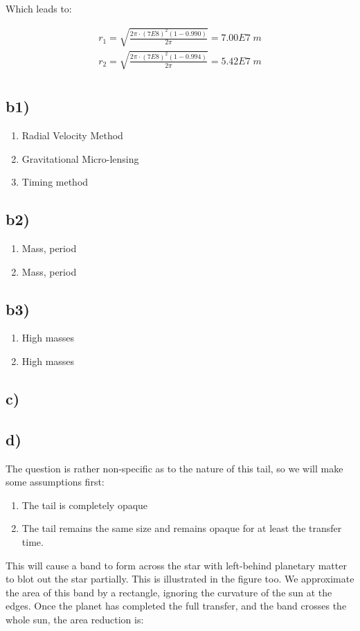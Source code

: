 Which leads to:

\begin{equation}
\begin{split}
    r_{1} = \sqrt{ \frac{2 \pi \cdot (7E8)^2 (1-0.990)}{2\pi}} = 7.00E7 \; m\\
    r_{2} = \sqrt{ \frac{2 \pi \cdot (7E8)^2 (1-0.994)}{2\pi}} = 5.42E7 \; m\\
\end{split}
\end{equation}

\subsection*{b1)}
\begin{enumerate}
    \item Radial Velocity Method
    \item Gravitational Micro-lensing
    \item Timing method
\end{enumerate}

\subsection*{b2)}
\begin{enumerate}
    \item Mass, period
    \item Mass, period
\end{enumerate}
\subsection*{b3)}
\begin{enumerate}
    \item High masses
    \item High masses
\end{enumerate}
\subsection*{c)}

\subsection*{d)}

The question is  rather non-specific as to the nature of this tail, so we will make some assumptions first:
\begin{enumerate}
    \item The tail is completely opaque
    \item The tail remains the same size and remains opaque for at least the transfer time.
\end{enumerate}
This will cause a band to form across the star with left-behind planetary matter to blot out the star partially. This is illustrated in the figure too. We approximate the area of this band by a rectangle, ignoring the curvature of the sun at the edges. Once the planet has completed the full transfer, and the band crosses the whole sun, the area reduction is:

